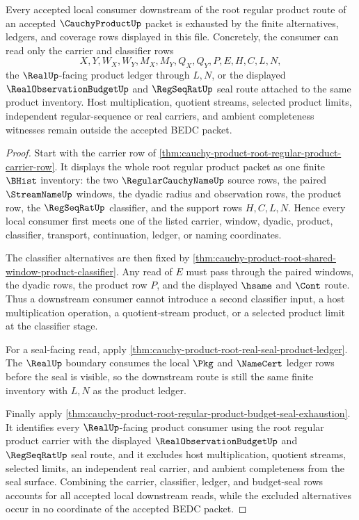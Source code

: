\begin{lemma}
\label{lem:cauchy-product-root-regular-product-downstream-coverage}
Every accepted local consumer downstream of the root regular product route of an accepted $\CauchyProductUp$ packet is exhausted by the finite alternatives, ledgers, and coverage rows displayed in this file. Concretely, the consumer can read only the carrier and classifier rows
$$
X,Y,W_X,W_Y,M_X,M_Y,Q_X,Q_Y,P,E,H,C,L,N,
$$
the $\RealUp$-facing product ledger through $L,N$, or the displayed $\RealObservationBudgetUp$ and $\RegSeqRatUp$ seal route attached to the same product inventory. Host multiplication, quotient streams, selected product limits, independent regular-sequence or real carriers, and ambient completeness witnesses remain outside the accepted BEDC packet.
\end{lemma}
\begin{proof}
Start with the carrier row of \autoref{thm:cauchy-product-root-regular-product-carrier-row}. It displays the whole root regular product packet as one finite $\BHist$ inventory: the two $\RegularCauchyNameUp$ source rows, the paired $\StreamNameUp$ windows, the dyadic radius and observation rows, the product row, the $\RegSeqRatUp$ classifier, and the support rows $H,C,L,N$. Hence every local consumer first meets one of the listed carrier, window, dyadic, product, classifier, transport, continuation, ledger, or naming coordinates.

The classifier alternatives are then fixed by \autoref{thm:cauchy-product-root-shared-window-product-classifier}. Any read of $E$ must pass through the paired windows, the dyadic rows, the product row $P$, and the displayed $\hsame$ and $\Cont$ route. Thus a downstream consumer cannot introduce a second classifier input, a host multiplication operation, a quotient-stream product, or a selected product limit at the classifier stage.

For a seal-facing read, apply \autoref{thm:cauchy-product-root-real-seal-product-ledger}. The $\RealUp$ boundary consumes the local $\Pkg$ and $\NameCert$ ledger rows before the seal is visible, so the downstream route is still the same finite inventory with $L,N$ as the product ledger.

Finally apply \autoref{thm:cauchy-product-root-regular-product-budget-seal-exhaustion}. It identifies every $\RealUp$-facing product consumer using the root regular product carrier with the displayed $\RealObservationBudgetUp$ and $\RegSeqRatUp$ seal route, and it excludes host multiplication, quotient streams, selected limits, an independent real carrier, and ambient completeness from the seal surface. Combining the carrier, classifier, ledger, and budget-seal rows accounts for all accepted local downstream reads, while the excluded alternatives occur in no coordinate of the accepted BEDC packet.
\end{proof}

